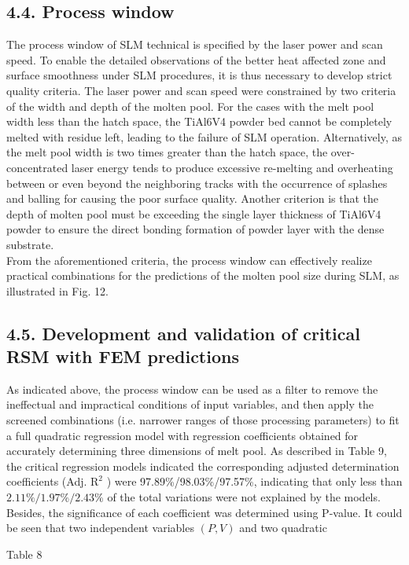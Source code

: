 \documentclass[10pt]{article}
\begin{document}
\subsection*{4.4. Process window}
The process window of SLM technical is specified by the laser power and scan speed. To enable the detailed observations of the better heat affected zone and surface smoothness under SLM procedures, it is thus necessary to develop strict quality criteria. The laser power and scan speed were constrained by two criteria of the width and depth of the molten pool. For the cases with the melt pool width less than the hatch space, the TiAl6V4 powder bed cannot be completely melted with residue left, leading to the failure of SLM operation. Alternatively, as the melt pool width is two times greater than the hatch space, the over-concentrated laser energy tends to produce excessive re-melting and overheating between or even beyond the neighboring tracks with the occurrence of splashes and balling for causing the poor surface quality. Another criterion is that the depth of molten pool must be exceeding the single layer thickness of TiAl6V4 powder to ensure the direct bonding formation of powder layer with the dense substrate.\\
From the aforementioned criteria, the process window can effectively realize practical combinations for the predictions of the molten pool size during SLM, as illustrated in Fig. 12.

\subsection*{4.5. Development and validation of critical RSM with FEM predictions}
As indicated above, the process window can be used as a filter to remove the ineffectual and impractical conditions of input variables, and then apply the screened combinations (i.e. narrower ranges of those processing parameters) to fit a full quadratic regression model with regression coefficients obtained for accurately determining three dimensions of melt pool. As described in Table 9, the critical regression models indicated the corresponding adjusted determination coefficients (Adj. $\mathrm{R}^{2}$ ) were 97.89\%/98.03\%/97.57\%, indicating that only less than $2.11 \% / 1.97 \% / 2.43 \%$ of the total variations were not explained by the models. Besides, the significance of each coefficient was determined using P-value. It could be seen that two independent variables $(P, V)$ and two quadratic

Table 8
\end{document}
